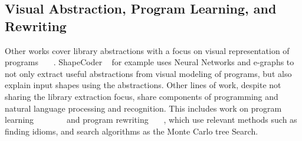 \subsection{Visual Abstraction, Program Learning, and Rewriting}
Other works cover library abstractions with a focus on visual representation of programs~\cite{jones2023shapecoder} ~\cite{wang2021learningVisAbst}~\cite{Jones_2021}. ShapeCoder ~\cite{jones2023shapecoder}  for example uses Neural Networks and e-graphs to not only extract useful abstractions from visual modeling of programs, but also explain input shapes using the abstractions. 
Other lines of work, despite not sharing the library extraction focus, share components of programming and natural language processing and recognition. This includes work on program learning~\cite{cropper2019playgol}~\cite{DBLP:journals/corr/abs-2004-09931refproginduc}~\cite{wong2022leveraging}  ~\cite{demo}~\cite{iyer2019learning} ~\cite{hocquette2024learning} and program rewriting~\cite{brandfonbrener2024verified} ~\cite{DBLP:conf/sat/NotzliRBNPBT19rewrite}~\cite{ganeshan2023improving}, which use relevant methods such as finding idioms, and search algorithms as the Monte Carlo tree Search. 
